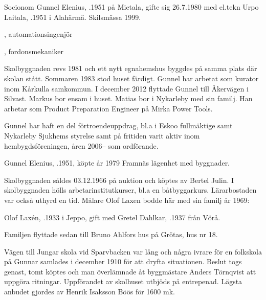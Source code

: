 Socionom Gunnel Elenius, .1951 på Mietala, gifte sig 26.7.1980 med el.tekn Urpo Laitala, .1951 i Alahärmä. Skilsmässa 1999.
\begin{jhchildren}
  \item {}, automationsingenjör
  \item {}, fordonsmekaniker
\end{jhchildren}
Skolbyggnaden revs 1981 och ett nytt egnahemshus byggdes på samma plats där skolan stått. Sommaren 1983 stod huset färdigt. Gunnel har arbetat som kurator inom Kårkulla samkommun.	I december 2012 flyttade Gunnel till Åkervägen i Silvast. Markus bor ensam i huset. Matias bor i Nykarleby med sin familj. Han arbetar som Product Preparation Engineer på Mirka Power Tools.

Gunnel har haft en del förtroendeuppdrag, bl.a i  Eskoo fullmäktige samt Nykarleby Sjukhems styrelse samt på fritiden varit aktiv inom hembygdsföreningen, åren 2006-- som ordförande.




Gunnel Elenius, .1951, köpte år 1979 Framnäs lägenhet med byggnader.


Skolbyggnaden såldes 03.12.1966 på auktion och köptes av Bertel Julin.	I skolbyggnaden hölls arbetarinstitutkurser, bl.a en båtbyggarkurs. Lärarbostaden var också uthyrd en tid. Målare Olof Laxen bodde här med sin familj år 1969:

Olof Laxén, .1933 i Jeppo, gift med Gretel Dahlkar, .1937 från Vörå.
\begin{jhchildren}
  \item {}
  \item {}
\end{jhchildren}
Familjen flyttade sedan till Bruno Ahlfors hus på Grötas, hus nr 18.


Vägen till Jungar skola vid Sparvbacken var lång och några ivrare för en folkskola på Gunnar samlades i december 1910 för att dryfta situationen. Beslut togs genast, tomt köptes och man överlämnade åt byggmästare Anders Törnqvist att uppgöra ritningar. Uppförandet av skolhuset utbjöds på entrepenad. Lägsta anbudet gjordes av Henrik Isaksson Böös för 1600 mk.

